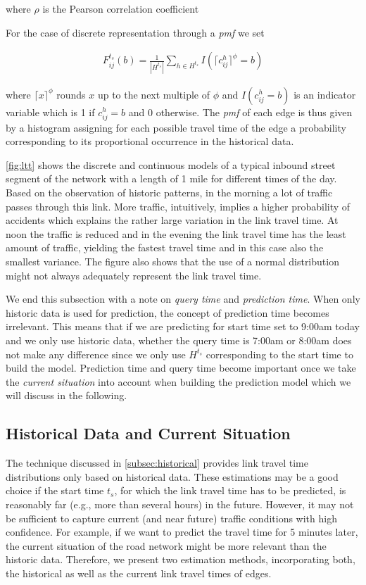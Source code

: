 where $\rho$ is the Pearson correlation coefficient \cite{Soper17}

For the case of discrete representation through a \textit{pmf} we set

\begin{gather}
  F_{ij}^{t_s}(b) = \frac{1}{|H^{t_s}|}\sum_{h\in H^{t_s}} I(\lceil c_{ij}^h \rceil^\phi= b)
\end{gather}

where $\lceil x \rceil^\phi$ rounds $x$ up to the next multiple of $\phi$ and $I(c_{ij}^h = b)$ is an indicator variable which is 1 if $c_{ij}^h = b$ and 0 otherwise. The \textit{pmf} of each edge is thus given by a histogram assigning for each possible travel time of the edge a probability corresponding to its proportional occurrence in the historical data. 

\cref{fig:ltt} shows the discrete and continuous models of a typical inbound street segment of the network with a length of 1 mile for different times of the day. Based on the observation of historic patterns, in the morning a lot of traffic passes through this link. More traffic, intuitively, implies a higher probability of accidents which explains the rather large variation in the link travel time. At noon the traffic is reduced and in the evening the link travel time has the least amount of traffic, yielding the fastest travel time and in this case also the smallest variance. The figure also shows that the use of a normal distribution might not always adequately represent the link travel time.

We end this subsection with a note on \textit{query time} and \textit{prediction time}. When only historic data is used for prediction, the concept of prediction time becomes irrelevant. This means that if we are predicting for start time set to 9:00am today and we only use historic data, whether the query time is 7:00am or 8:00am does not make any difference since we only use $H^{t_s}$ corresponding to the start time to build the model. Prediction time and query time become important once we take the \textit{current situation} into account when building the prediction model which we will discuss in the following. 

\subsection{Historical Data and Current Situation}
The technique discussed in \cref{subsec:historical} provides link travel time distributions only based on historical data. These estimations may be a good choice if the start time $t_s$, for which the link travel time has to be predicted, is reasonably far (e.g., more than several hours) in the future. However, it may not be sufficient to capture current (and near future) traffic conditions with high confidence. For example, if we want to predict the travel time for 5 minutes later, the current situation of the road network might be more relevant than the historic data. Therefore, we present two estimation methods, incorporating both, the historical as well as the current link travel times of edges.

